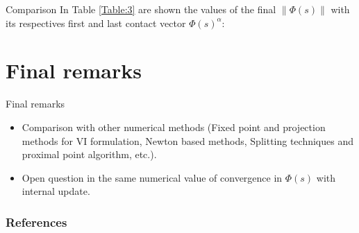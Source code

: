 \documentclass[8pt,red]{beamer}
\theoremstyle{plain}
\theoremstyle{definition}
\theoremstyle{remark}
\begin{document}
\begin{frame}{Comparison}
In Table \ref{Table:3} are shown the values of the final $\| \Phi(s) \|$ with its respectives first and last contact vector $\Phi(s)^{\alpha}$:
\begin{table}[h!]
\caption{Comparison of s-update}
\label{Table:3}
\end{table}

\end{frame}

\section{Final remarks}
\begin{frame}{Final remarks}
\begin{itemize}
\item Comparison with other numerical methods (Fixed point and projection methods for VI formulation, Newton based methods, Splitting techniques and proximal point algorithm, etc.).
\item Open question in the same numerical value of convergence in  $\Phi(s)$ with internal update.
\end{itemize}
\end{frame}

\begin{frame}[allowframebreaks]
\frametitle{References}


\end{frame}
\end{document}
